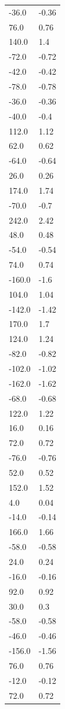 \begin{longtable}{ll}
-36.0 & -0.36 \\
76.0 & 0.76 \\
140.0 & 1.4 \\
-72.0 & -0.72 \\
-42.0 & -0.42 \\
-78.0 & -0.78 \\
-36.0 & -0.36 \\
-40.0 & -0.4 \\
112.0 & 1.12 \\
62.0 & 0.62 \\
-64.0 & -0.64 \\
26.0 & 0.26 \\
174.0 & 1.74 \\
-70.0 & -0.7 \\
242.0 & 2.42 \\
48.0 & 0.48 \\
-54.0 & -0.54 \\
74.0 & 0.74 \\
-160.0 & -1.6 \\
104.0 & 1.04 \\
-142.0 & -1.42 \\
170.0 & 1.7 \\
124.0 & 1.24 \\
-82.0 & -0.82 \\
-102.0 & -1.02 \\
-162.0 & -1.62 \\
-68.0 & -0.68 \\
122.0 & 1.22 \\
16.0 & 0.16 \\
72.0 & 0.72 \\
-76.0 & -0.76 \\
52.0 & 0.52 \\
152.0 & 1.52 \\
4.0 & 0.04 \\
-14.0 & -0.14 \\
166.0 & 1.66 \\
-58.0 & -0.58 \\
24.0 & 0.24 \\
-16.0 & -0.16 \\
92.0 & 0.92 \\
30.0 & 0.3 \\
-58.0 & -0.58 \\
-46.0 & -0.46 \\
-156.0 & -1.56 \\
76.0 & 0.76 \\
-12.0 & -0.12 \\
72.0 & 0.72 \\

\end{longtable}
